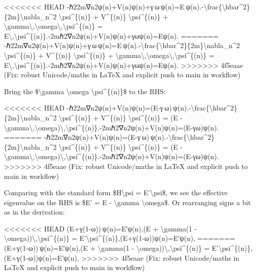 \documentclass[]{article}
\begin{document}
<<<<<<< HEAD
-ℏ22m∇n2ψ(n)+V(n)ψ(n)+γ ω ψ(n)=E ψ(n).-\textbackslash frac\{\textbackslash hbar\^{}2\}\{2m\}\textbackslash nabla\_n\^{}2
\textbackslash psi\^{}\{(n)\} + V\^{}\{(n)\}
\textbackslash psi\^{}\{(n)\} +
\textbackslash gamma\textbackslash,\textbackslash omega\textbackslash,\textbackslash psi\^{}\{(n)\}
=
E\textbackslash,\textbackslash psi\^{}\{(n)\}.-2mℏ2\hspace{0pt}∇n2\hspace{0pt}ψ(n)+V(n)ψ(n)+γωψ(n)=Eψ(n).
=======
-ℏ22m∇n2ψ(n)+V(n)ψ(n)+γ ω ψ(n)=E ψ(n).-\textbackslash{}frac\{\textbackslash{}hbar\^{}2\}\{2m\}\textbackslash{}nabla\_n\^{}2
\textbackslash{}psi\^{}\{(n)\} + V\^{}\{(n)\}
\textbackslash{}psi\^{}\{(n)\} +
\textbackslash{}gamma\textbackslash{},\textbackslash{}omega\textbackslash{},\textbackslash{}psi\^{}\{(n)\}
=
E\textbackslash{},\textbackslash{}psi\^{}\{(n)\}.-2mℏ2​∇n2​ψ(n)+V(n)ψ(n)+γωψ(n)=Eψ(n).
>>>>>>> 4f5eaae (Fix: robust Unicode/maths in LaTeX and explicit push to main in workflow)

Bring the \$\textbackslash{}gamma \textbackslash{}omega
\textbackslash{}psi\^{}\{(n)\}\$ to the RHS:

<<<<<<< HEAD
-ℏ22m∇n2ψ(n)+V(n)ψ(n)=(E-γ ω) ψ(n).-\textbackslash frac\{\textbackslash hbar\^{}2\}\{2m\}\textbackslash nabla\_n\^{}2
\textbackslash psi\^{}\{(n)\} + V\^{}\{(n)\}
\textbackslash psi\^{}\{(n)\} = (E -
\textbackslash gamma\textbackslash,\textbackslash omega)\textbackslash,\textbackslash psi\^{}\{(n)\}.-2mℏ2\hspace{0pt}∇n2\hspace{0pt}ψ(n)+V(n)ψ(n)=(E-γω)ψ(n).\hspace{0pt}
=======
-ℏ22m∇n2ψ(n)+V(n)ψ(n)=(E-γ ω) ψ(n).-\textbackslash{}frac\{\textbackslash{}hbar\^{}2\}\{2m\}\textbackslash{}nabla\_n\^{}2
\textbackslash{}psi\^{}\{(n)\} + V\^{}\{(n)\}
\textbackslash{}psi\^{}\{(n)\} = (E -
\textbackslash{}gamma\textbackslash{},\textbackslash{}omega)\textbackslash{},\textbackslash{}psi\^{}\{(n)\}.-2mℏ2​∇n2​ψ(n)+V(n)ψ(n)=(E-γω)ψ(n).​
>>>>>>> 4f5eaae (Fix: robust Unicode/maths in LaTeX and explicit push to main in workflow)

Comparing with the standard form \$H\textbackslash{}psi =
E'\textbackslash{}psi\$, we see the effective eigenvalue on the RHS is
\$E' = E - \textbackslash{}gamma \textbackslash{}omega\$. Or rearranging
signs a bit as in the derivation:

<<<<<<< HEAD
(E+γ(1-ω)) ψ(n)=E′ψ(n),(E + \textbackslash gamma(1 -
\textbackslash omega))\textbackslash,\textbackslash psi\^{}\{(n)\} =
E'\textbackslash psi\^{}\{(n)\},(E+γ(1-ω))ψ(n)=E′ψ(n),
=======
(E+γ(1-ω)) ψ(n)=E′ψ(n),(E + \textbackslash{}gamma(1 -
\textbackslash{}omega))\textbackslash{},\textbackslash{}psi\^{}\{(n)\} =
E'\textbackslash{}psi\^{}\{(n)\},(E+γ(1-ω))ψ(n)=E′ψ(n),
>>>>>>> 4f5eaae (Fix: robust Unicode/maths in LaTeX and explicit push to main in workflow)
\end{document}
